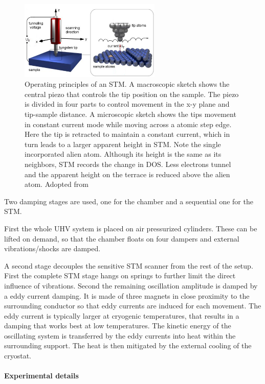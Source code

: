 \begin{figure}\centering
	
\includegraphics[width=0.6\textwidth]{./images/stm-rutgers-modified.jpg}
	\caption{Operating principles of an STM. A macroscopic sketch  shows the central piezo that controls the tip position on the sample. The piezo is divided in four parts to control movement in the x-y plane and tip-sample distance. A microscopic sketch shows the tips movement in constant current mode while moving across a atomic step edge. Here the tip is retracted to maintain a constant current, which in turn leads to a larger apparent height in STM. Note the single incorporated alien atom. Although its height is the same as its neighbors, STM records the change in DOS. Less electrons tunnel and the apparent height on the terrace is reduced above the alien atom. Adopted from \cite{STM-rutgers}}
\label{fig:STM-tip}
\end{figure}

Two damping stages are used, one for the chamber and a sequential one for the STM.

First the whole UHV system is placed on air pressurized cylinders. These can be lifted on demand, so that the chamber floats on four dampers and external vibrations/shocks are damped. 

A second stage decouples the sensitive STM scanner from the rest of the setup. First the complete STM stage hangs on springs to further limit the direct influence of vibrations. Second the remaining oscillation amplitude is damped by a eddy current damping. It is made of three magnets in close proximity to the surrounding conductor so that eddy currents are induced for each movement. The eddy current is typically larger at cryogenic temperatures, that results in a damping that works best at low temperatures. The kinetic energy of the oscillating system is transferred by the eddy currents into heat within the surrounding support. The heat is then mitigated by the external cooling of the cryostat.

\paragraph{Experimental details}

